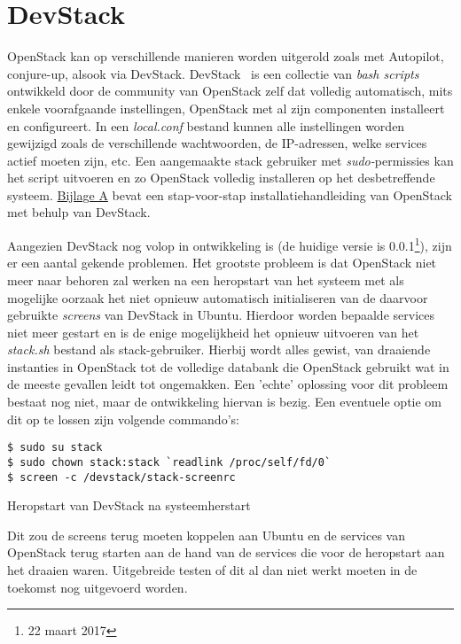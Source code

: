 \section{DevStack}

OpenStack kan op verschillende manieren worden uitgerold zoals met Autopilot, conjure-up, alsook via DevStack. DevStack~\cite{OpenStack2017a} is een collectie van \textit{bash scripts} ontwikkeld door de community van OpenStack zelf dat volledig automatisch, mits enkele voorafgaande instellingen, OpenStack met al zijn componenten installeert en configureert. In een \textit{local.conf} bestand kunnen alle instellingen worden gewijzigd zoals de verschillende wachtwoorden, de IP-adressen, welke services actief moeten zijn, etc. Een aangemaakte stack gebruiker met \textit{sudo-}permissies kan het script uitvoeren en zo OpenStack volledig installeren op het desbetreffende systeem. \hyperref[att:installation]{Bijlage A} bevat een stap-voor-stap installatiehandleiding van OpenStack met behulp van DevStack.

Aangezien DevStack nog volop in ontwikkeling is (de huidige versie is 0.0.1\footnote{22 maart 2017}), zijn er een aantal gekende problemen. Het grootste probleem is dat OpenStack niet meer naar behoren zal werken na een heropstart van het systeem met als mogelijke oorzaak het niet opnieuw automatisch initialiseren van de daarvoor gebruikte \textit{screens} van DevStack in Ubuntu. Hierdoor worden bepaalde services niet meer gestart en is de enige mogelijkheid het opnieuw uitvoeren van het \textit{stack.sh} bestand als stack-gebruiker. Hierbij wordt alles gewist, van draaiende instanties in OpenStack tot de volledige databank die OpenStack gebruikt wat in de meeste gevallen leidt tot ongemakken. Een 'echte' oplossing voor dit probleem bestaat nog niet, maar de ontwikkeling hiervan is bezig. Een eventuele optie om dit op te lossen zijn volgende commando's:

\begin{code}
\begin{verbatim}
$ sudo su stack
$ sudo chown stack:stack `readlink /proc/self/fd/0`
$ screen -c /devstack/stack-screenrc
\end{verbatim}
\caption{Heropstart van DevStack na systeemherstart}
\end{code}

Dit zou de screens terug moeten koppelen aan Ubuntu en de services van OpenStack terug starten aan de hand van de services die voor de heropstart aan het draaien waren. Uitgebreide testen of dit al dan niet werkt moeten in de toekomst nog uitgevoerd worden.

